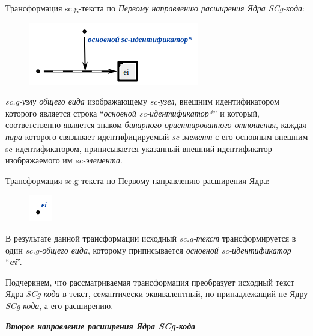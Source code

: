 \bigskip
Трансформация sc.g-текста по \textit{Первому направлению расширения Ядра SCg-кода}:
\begin{figure}[h]
	\centering
	\includegraphics[scale=0.8]{images/intro/scg/scg_transf2.png}
\end{figure}
\textit{sc.g-узлу общего вида} изображающему \textit{sc-узел}, внешним идентификатором которого является строка ``\textit{основной sc-идентификатор*}'' и который, соответственно является знаком \textit{бинарного ориентированного отношения}, каждая \textit{пара} которого связывает идентифицируемый \textit{sc-элемент} с его основным внешним sc-идентификатором, приписывается указанный внешний идентификатор изображаемого им \textit{sc-элемента}.

\bigskip
Трансформация sc.g-текста по Первому направлению расширения Ядра:
\begin{figure}[h]
	\centering
	\includegraphics[scale=0.8]{images/intro/scg/scg_transf3.png}
\end{figure}

В результате данной трансформации исходный \mbox{\textit{sc.g-текст}} трансформируется в один \textit{sc.g-общего вида}, которому приписывается \textit{основной sc-идентификатор} ``\textit{\textbf{ei}}''.

Подчеркнем, что рассматриваемая трансформация преобразует исходный текст Ядра \textit{SCg-кода} в текст, семантически эквивалентный, но принадлежащий не Ядру \textit{SCg-кода}, а его расширению.



\textbf{\textit{Второе направление расширения Ядра SCg-кода}}

